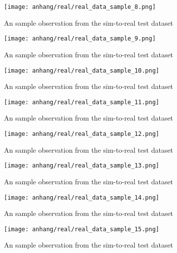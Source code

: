 	\begin{figure}[H]
		\centering
		\texttt{[image: anhang/real/real\_data\_sample\_8.png]}
		\caption[An sample observation from the sim-to-real test dataset.]{An sample observation from the sim-to-real test dataset}
	\end{figure}
	\begin{figure}[H]
		\centering
		\texttt{[image: anhang/real/real\_data\_sample\_9.png]}
		\caption[An sample observation from the sim-to-real test dataset.]{An sample observation from the sim-to-real test dataset}
	\end{figure}
	\begin{figure}[H]
		\centering
		\texttt{[image: anhang/real/real\_data\_sample\_10.png]}
		\caption[An sample observation from the sim-to-real test dataset.]{An sample observation from the sim-to-real test dataset}
	\end{figure}
	\begin{figure}[H]
		\centering
		\texttt{[image: anhang/real/real\_data\_sample\_11.png]}
		\caption[An sample observation from the sim-to-real test dataset.]{An sample observation from the sim-to-real test dataset}
	\end{figure}
	\begin{figure}[H]
		\centering
		\texttt{[image: anhang/real/real\_data\_sample\_12.png]}
		\caption[An sample observation from the sim-to-real test dataset.]{An sample observation from the sim-to-real test dataset}
	\end{figure}
	\begin{figure}[H]
		\centering
		\texttt{[image: anhang/real/real\_data\_sample\_13.png]}
		\caption[An sample observation from the sim-to-real test dataset.]{An sample observation from the sim-to-real test dataset}
	\end{figure}
	\begin{figure}[H]
		\centering
		\texttt{[image: anhang/real/real\_data\_sample\_14.png]}
		\caption[An sample observation from the sim-to-real test dataset.]{An sample observation from the sim-to-real test dataset}
	\end{figure}
	\begin{figure}[H]
		\centering
		\texttt{[image: anhang/real/real\_data\_sample\_15.png]}
		\caption[An sample observation from the sim-to-real test dataset.]{An sample observation from the sim-to-real test dataset}
	\end{figure}

	
